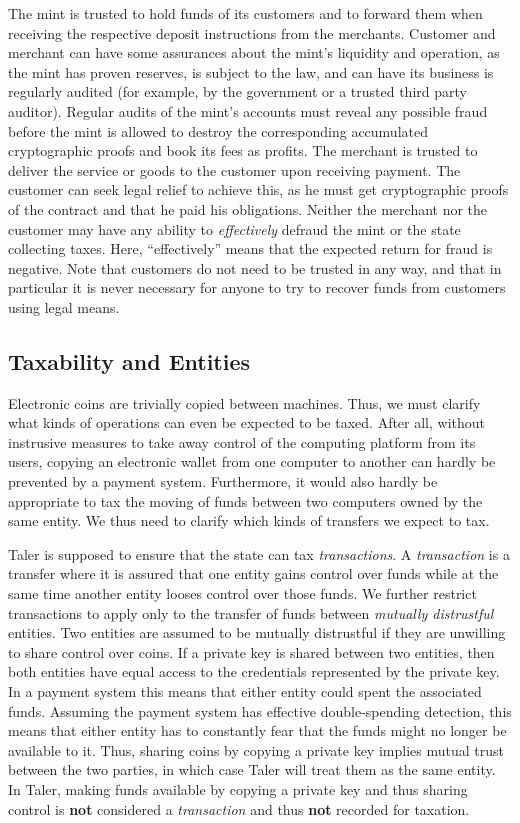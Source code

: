 \documentclass{llncs}
\begin{document}
The mint is trusted to hold funds of its customers and to forward them
when receiving the respective deposit instructions from the merchants.
Customer and merchant can have some assurances about the mint's
liquidity and operation, as the mint has proven reserves, is subject
to the law, and can have its business is regularly audited (for
example, by the government or a trusted third party auditor).
Regular audits of the mint's accounts must reveal any possible fraud
before the mint is allowed to destroy the corresponding accumulated
cryptographic proofs and book its fees as profits.
%
The merchant is trusted to deliver the service or goods to the
customer upon receiving payment.  The customer can seek legal relief
to achieve this, as he must get cryptographic proofs of the contract
and that he paid his obligations.
%
Neither the merchant nor the customer may have any ability to {\em
  effectively} defraud the mint or the state collecting taxes.  Here,
``effectively'' means that the expected return for fraud is negative.
Note that customers do not need to be trusted in any way, and that in
particular it is never necessary for anyone to try to recover funds
from customers using legal means.


\subsection{Taxability and Entities}

Electronic coins are trivially copied between machines.  Thus, we must
clarify what kinds of operations can even be expected to be taxed.
After all, without instrusive measures to take away control of the
computing platform from its users, copying an electronic wallet from
one computer to another can hardly be prevented by a payment system.
Furthermore, it would also hardly be appropriate to tax the moving of
funds between two computers owned by the same entity.  We thus
need to clarify which kinds of transfers we expect to tax.

Taler is supposed to ensure that the state can tax {\em transactions}.
A {\em transaction} is a transfer where it is assured that one entity
gains control over funds while at the same time another entity looses
control over those funds.  We further restrict transactions to apply
only to the transfer of funds between {\em mutually distrustful}
entities.  Two entities are assumed to be mutually distrustful if they
are unwilling to share control over coins.  If a private key is shared
between two entities, then both entities have equal access to the
credentials represented by the private key.  In a payment system this
means that either entity could spent the associated funds.  Assuming
the payment system has effective double-spending detection, this means
that either entity has to constantly fear that the funds might no
longer be available to it.  Thus, sharing coins by copying a private
key implies mutual trust between the two parties, in which case Taler
will treat them as the same entity.  In Taler, making funds available
by copying a private key and thus sharing control is {\bf not}
considered a {\em transaction} and thus {\bf not} recorded for
taxation.
\end{document}
